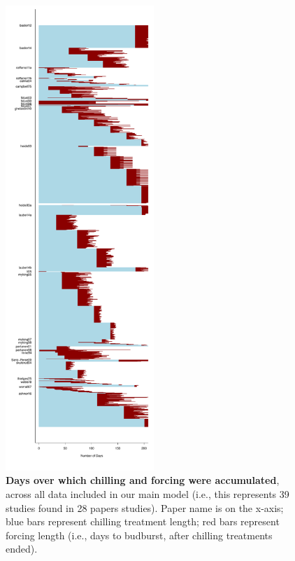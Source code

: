 \documentclass{article}
\begin{document}
\begin{figure}[h!]
\centering
\noindent \includegraphics[width=0.50\textwidth]{..//..//analyses/bb_analysis/figures/chilldaysforcedays.pdf}
\caption{\textbf{Days over which chilling and forcing were accumulated}, across all data included in our main model (i.e., this represents 39 studies found in 28 papers studies). Paper name is on the x-axis; blue bars represent chilling treatment length; red bars represent forcing length (i.e., days to budburst, after chilling treatments ended).}
\label{fig:chillforceplot}
\end{figure}
\end{document}
